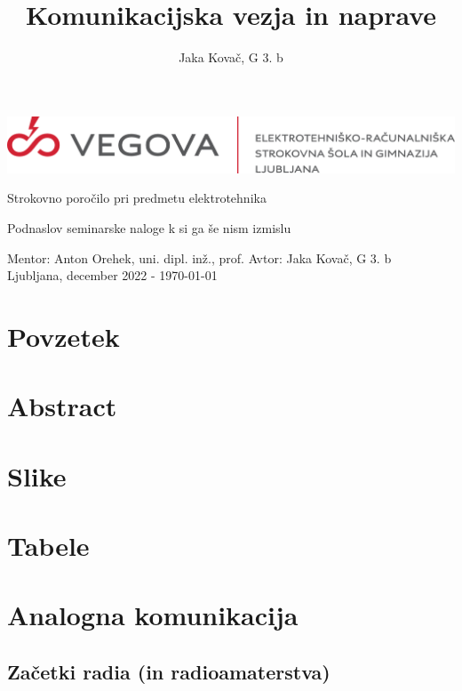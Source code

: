 \documentclass[12pt]{article}
\author{Jaka Kovač, G 3. b}
\begin{document}

\begin{center}
    \thispagestyle{empty}
    \includegraphics[scale=1]{slike/logotip_vegova_leze_brezokvirja.png}
    
    \vspace{\fill} 
    Strokovno poročilo pri predmetu elektrotehnika

    \title{Komunikacijska vezja in naprave}

    \normalsize
    Podnaslov seminarske naloge k si ga še nism izmislu
    \vspace{\fill}

    Mentor: Anton Orehek, uni. dipl. inž., prof. \hfill Avtor: Jaka Kovač, G 3. b\\
    \null
    Ljubljana, december 2022 - \MMYYYYdate\today
\end{center}
\newpage
\null
\newpage

\section*{Povzetek}
\section*{Abstract}

\newpage
\tableofcontents

\newpage
\begingroup
\makeatletter
\section*{Slike}
\let\clearpage\relax
\section*{Tabele}
\makeatother
\endgroup


\newpage
\section{Analogna komunikacija}
    \subsection{Začetki radia (in radioamaterstva)}
\end{document}
